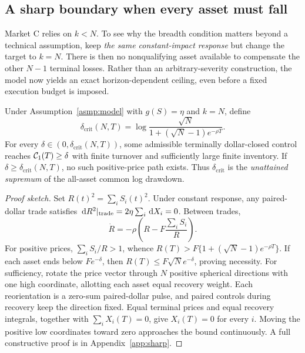 \documentclass[review,hidelinks,onefignum,onetabnum]{siamonline250211}
\begin{document}
\FloatBarrier
\subsection{A sharp boundary when every asset must fall}\label{sec:allcoverage}
Market C relies on $k<N$. To see why the breadth condition matters beyond a technical assumption, keep \emph{the same constant-impact response} but change the target to $k=N$. There is then no nonqualifying asset available to compensate the other $N-1$ terminal losses. Rather than an arbitrary-severity construction, the model now yields an exact horizon-dependent ceiling, even before a fixed execution budget is imposed.

\begin{theorem}\label{thm:critical}
Under Assumption~\ref{asmp:model} with $g(S)=\eta$ and $k=N$, define
\begin{equation}\label{eq:critical}
\boxed{\delta_{\mathrm{crit}}(N,T)=
\log\frac{\sqrt N}{1+(\sqrt N-1)e^{-\rho T}}.}
\end{equation}
For every $\delta\in(0,\delta_{\mathrm{crit}}(N,T))$, some admissible terminally dollar-closed control reaches $\mathcal{C}_1(T)\ge\delta$ with finite turnover and sufficiently large finite inventory. If $\delta\ge\delta_{\mathrm{crit}}(N,T)$, no such positive-price path exists. Thus $\delta_{\mathrm{crit}}$ is the \emph{unattained supremum} of the all-asset common log drawdown.
\end{theorem}
\begin{proof}[Proof sketch]
Set $R(t)^2=\sum_iS_i(t)^2$. Under constant response, any paired-dollar trade satisfies $\,\mathrm{d} R^2|_{\rm trade}=2\eta\sum_i\,\mathrm{d} X_i=0$. Between trades,
\[
\dot R=-\rho\left(R-F\frac{\sum_iS_i}{R}\right).
\]
For positive prices, $\sum_iS_i/R>1$, whence $R(T)>F\{1+(\sqrt N-1)e^{-\rho T}\}$. If each asset ends below $Fe^{-\delta}$, then $R(T)\le F\sqrt Ne^{-\delta}$, proving necessity. For sufficiency, rotate the price vector through $N$ positive spherical directions with one high coordinate, allotting each asset equal recovery weight. Each reorientation is a zero-sum paired-dollar pulse, and paired controls during recovery keep the direction fixed. Equal terminal prices and equal recovery integrals, together with $\sum_iX_i(T)=0$, give $X_i(T)=0$ for every $i$. Moving the positive low coordinates toward zero approaches the bound continuously. A full constructive proof is in Appendix~\ref{app:sharp}.
\end{proof}
\end{document}
